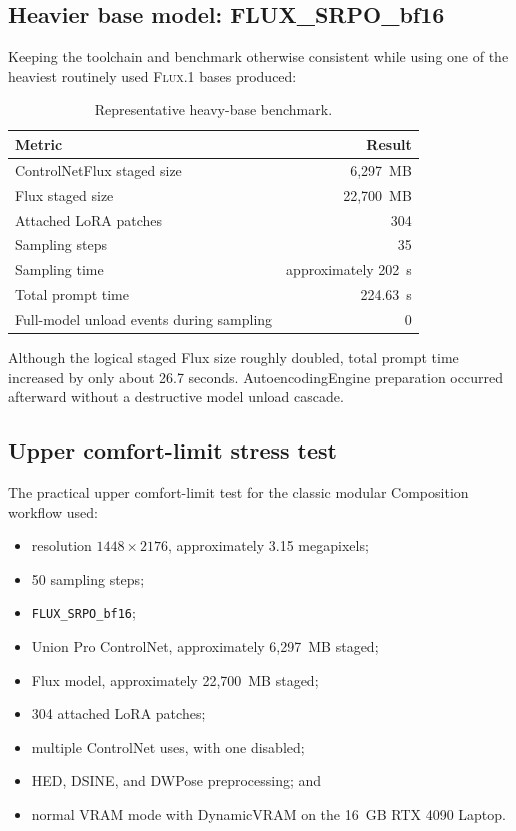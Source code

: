 \documentclass[11pt]{article}
\newcommand{\FluxOne}{\textsc{Flux.1}}
\newcommand{\code}[1]{\texttt{#1}}
\begin{document}
\subsection{Heavier base model: FLUX\_SRPO\_bf16}

Keeping the toolchain and benchmark otherwise consistent while using one of the heaviest routinely used \FluxOne{} bases produced:

\begin{table}[H]
\centering
\caption{Representative heavy-base benchmark.}
\begin{tabular}{@{}lr@{}}
\toprule
Metric & Result \\
\midrule
ControlNetFlux staged size & 6,297~MB \\
Flux staged size & 22,700~MB \\
Attached LoRA patches & 304 \\
Sampling steps & 35 \\
Sampling time & approximately 202~s \\
Total prompt time & 224.63~s \\
Full-model unload events during sampling & 0 \\
\bottomrule
\end{tabular}
\end{table}

Although the logical staged Flux size roughly doubled, total prompt time increased by only about 26.7 seconds. AutoencodingEngine preparation occurred afterward without a destructive model unload cascade.

\subsection{Upper comfort-limit stress test}

The practical upper comfort-limit test for the classic modular Composition workflow used:

\begin{itemize}
  \item resolution $1448\times2176$, approximately 3.15 megapixels;
  \item 50 sampling steps;
  \item \code{FLUX\_SRPO\_bf16};
  \item Union Pro ControlNet, approximately 6,297~MB staged;
  \item Flux model, approximately 22,700~MB staged;
  \item 304 attached LoRA patches;
  \item multiple ControlNet uses, with one disabled;
  \item HED, DSINE, and DWPose preprocessing; and
  \item normal VRAM mode with DynamicVRAM on the 16~GB RTX 4090 Laptop.
\end{itemize}
\end{document}

